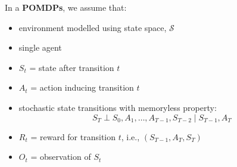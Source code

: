 \begin{summary}
    In a \textbf{POMDPs}, we assume that: 
    \begin{itemize}
        \item environment modelled using state space, $\mathcal{S}$
        \item single agent
        \item $S_t$ = state after transition $t$
        \item $A_t$ = action inducing transition $t$
        \item stochastic state transitions with memoryless property:
        \[
        S_T \perp S_0, A_1, \dots, A_{T-1}, S_{T-2} \mid S_{T-1}, A_T
        \]
        \item $R_t$ = reward for transition $t$, i.e., $(S_{T-1}, A_T, S_T)$
        \item $O_t$ = observation of $S_t$
    \end{itemize}
    \vspace{1em}


\end{summary}
